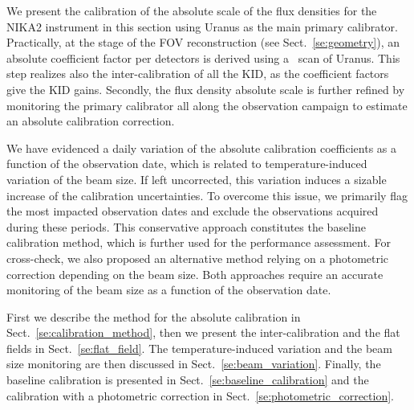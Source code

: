 
We present the calibration of the absolute scale of the flux densities
for the NIKA2 instrument in this section using Uranus as the main
primary calibrator. Practically, at the stage of the FOV
reconstruction (see Sect.~\ref{se:geometry}), an absolute
coefficient factor per detectors is derived using a \bm\ scan of
Uranus. This step realizes also the inter-calibration of all the KID,
as the coefficient factors give the KID gains. Secondly, the flux
density absolute scale is further refined by monitoring the primary
calibrator all along the observation campaign to estimate an
absolute calibration correction.

We have evidenced a daily variation of the absolute calibration
coefficients as a function of the observation date, which is related
to temperature-induced variation of the beam size. If left uncorrected, this variation
induces a sizable increase of the calibration uncertainties. To
overcome this issue, we primarily flag the most impacted observation
dates and exclude the observations acquired during these periods. This
conservative approach constitutes the baseline calibration method,
which is further used for the performance assessment. For cross-check,
we also proposed an alternative method relying on a photometric
correction depending on the beam size. Both approaches require an
accurate monitoring of the beam size as a function of the observation
date.


First we describe the method for the absolute calibration in
Sect.~\ref{se:calibration_method}, then we present the
inter-calibration and the flat fields in
Sect.~\ref{se:flat_field}. The temperature-induced variation and the
beam size monitoring are then discussed in
Sect.~\ref{se:beam_variation}. Finally, the baseline calibration is
presented in Sect.~\ref{se:baseline_calibration} and the calibration
with a photometric correction in
Sect.~\ref{se:photometric_correction}.  




